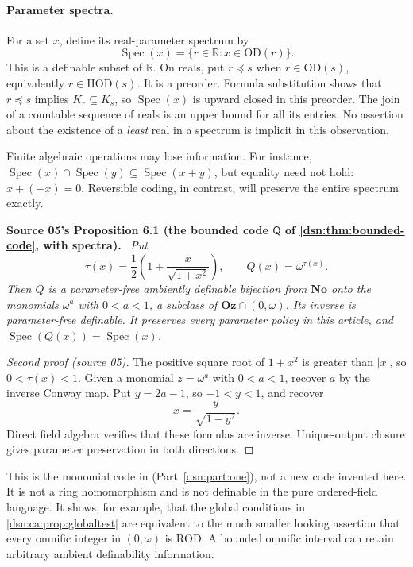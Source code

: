 \documentclass[11pt,a4paper]{article}
\numberwithin{equation}{section}
\theoremstyle{definition}
\theoremstyle{remark}
\newcommand{\No}{\mathbf{No}}
\newcommand{\Oz}{\mathbf{Oz}}
\newcommand{\OD}{\mathrm{OD}}
\newcommand{\HOD}{\mathrm{HOD}}
\newcommand{\R}{\mathbb R}
\newcommand{\Mc}{\mathsf Q}
\newenvironment{dupstatement}[1]{\par\medskip\noindent\textbf{#1.}\ \begingroup\itshape\ignorespaces}{\endgroup\par\medskip}
\newcommand{\ROD}{\mathrm{ROD}}
\newcommand{\Spec}{\operatorname{Spec}}
\begin{document}
\paragraph{Parameter spectra.}
For a set $x$, define its real-parameter spectrum by
\[
 \Spec(x)=\{r\in\R:x\in\OD(r)\}.
\]
This is a definable subset of $\R$. On reals, put
$r\preceq s$ when $r\in\OD(s)$, equivalently $r\in\HOD(s)$. It is a
preorder. Formula substitution shows that $r\preceq s$ implies
$K_r\subseteq K_s$, so $\Spec(x)$ is upward closed in this preorder.
The join of a countable sequence of reals is an upper bound for all
its entries. No assertion about the existence of a \emph{least}
real in a spectrum is implicit in this observation.

Finite algebraic operations may lose information. For instance,
$\Spec(x)\cap\Spec(y)\subseteq\Spec(x+y)$, but equality need not hold:
$x+(-x)=0$. Reversible coding, in contrast, will preserve the entire
spectrum exactly.

\begin{dupstatement}{Source 05's Proposition 6.1 (the bounded code $\Mc$ of \cref{dsn:thm:bounded-code}, with spectra)}
Put
\begin{equation}\label{dsn:ca:eq:bounded}
 \tau(x)=\frac12\left(1+\frac{x}{\sqrt{1+x^2}}\right),
 \qquad Q(x)=\omega^{\tau(x)}.
\end{equation}
Then $Q$ is a parameter-free ambiently definable bijection from $\No$
onto the monomials $\omega^a$ with $0<a<1$, a subclass of
$\Oz\cap(0,\omega)$. Its inverse is parameter-free definable. It
preserves every parameter policy in this article, and
$\Spec(Q(x))=\Spec(x)$.
\end{dupstatement}
\begin{proof}[Second proof (source 05)]
The positive square root of $1+x^2$ is greater than $|x|$, so
$0<\tau(x)<1$. Given a monomial $z=\omega^a$ with $0<a<1$, recover $a$
by the inverse Conway map. Put $y=2a-1$, so $-1<y<1$, and recover
\[
 x=\frac{y}{\sqrt{1-y^2}}.
\]
Direct field algebra verifies that these formulas are inverse.
Unique-output closure gives parameter preservation in both directions.
\end{proof}
This is the monomial code in (Part~\ref{dsn:part:one}), not a new code
invented here. It is not a ring homomorphism and is not definable in the
pure ordered-field language. It shows, for example, that the global
conditions in \cref{dsn:ca:prop:globaltest} are equivalent to the much smaller
looking assertion that every omnific integer in $(0,\omega)$ is $\ROD$.
A bounded omnific interval can retain arbitrary ambient definability
information.
\end{document}
